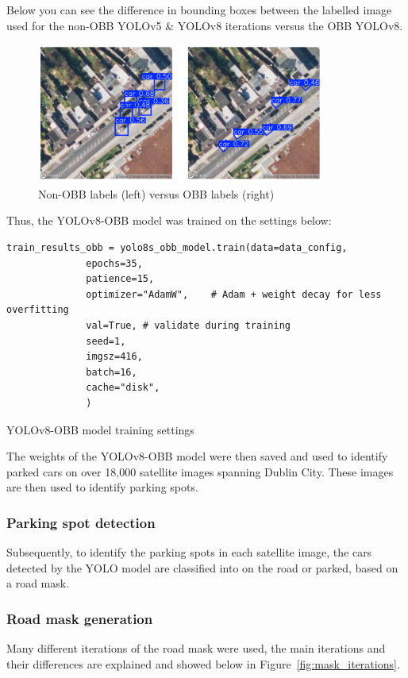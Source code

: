 Below you can see the difference in bounding boxes between the labelled image
used for the non-OBB YOLOv5 \& YOLOv8 iterations versus the OBB YOLOv8.

\begin{figure}[htbp]
  \centering
  \includegraphics[width=0.85\textwidth]{images/obb-vs-nonobb-img.png}
  \caption{Non-OBB labels (left) versus OBB labels (right)}
\end{figure}

\newpage{}

Thus, the YOLOv8-OBB model was trained on the settings below:

\begin{listing}[htbp]
  \centering
  \begin{verbatim}
train_results_obb = yolo8s_obb_model.train(data=data_config,
              epochs=35,
              patience=15,
              optimizer="AdamW",    # Adam + weight decay for less overfitting
              val=True, # validate during training
              seed=1,
              imgsz=416,
              batch=16,
              cache="disk",
              )
  \end{verbatim}
  \caption{YOLOv8-OBB model training settings}
\end{listing}

The weights of the YOLOv8-OBB model were then saved and used to identify parked
cars on over 18,000 satellite images spanning Dublin City. These images are then
used to identify parking spots.

\subsubsection{Parking spot detection}
Subsequently, to identify the parking spots in each satellite image, the cars
detected by the YOLO model are classified into on the road or parked, based on a
road mask.

\subsubsection{Road mask generation} \label{sec:road_mask_generation} Many
different iterations of the road mask were used, the main iterations and their
differences are explained and showed below in Figure~\ref{fig:mask_iterations}.

